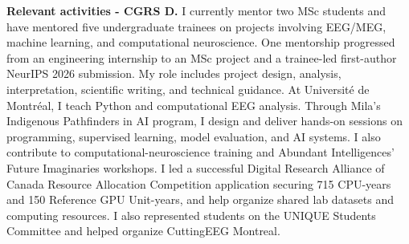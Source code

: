 \documentclass[12pt,letterpaper]{article}
\begin{document}
\noindent\textbf{Relevant activities - CGRS D.}
I currently mentor two MSc students and have mentored five undergraduate trainees
on projects involving EEG/MEG, machine learning, and computational neuroscience.
One mentorship progressed from an engineering internship to an MSc project and a
trainee-led first-author NeurIPS 2026 submission. My role includes project design,
analysis, interpretation, scientific writing, and technical guidance. At Université
de Montréal, I teach Python and computational EEG analysis. Through Mila's Indigenous
Pathfinders in AI program, I design and deliver hands-on sessions on programming,
supervised learning, model evaluation, and AI systems. I also contribute to
computational-neuroscience training and Abundant Intelligences' Future Imaginaries
workshops. I led a successful Digital Research Alliance of Canada Resource Allocation Competition
application securing 715 CPU-years and 150 Reference GPU Unit-years, and help organize shared lab
datasets and computing resources. I also represented students on the UNIQUE Students
Committee and helped organize CuttingEEG Montreal.
\end{document}
